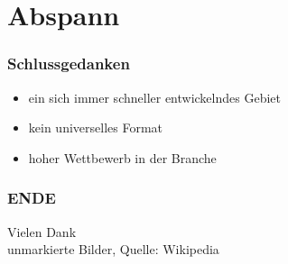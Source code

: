 \documentclass{beamer}
\begin{document}
\section{Abspann}

\begin{frame}
\frametitle{Schlussgedanken}
\begin{itemize}
	\Large	
	\item ein sich immer schneller entwickelndes Gebiet
	\vspace{0.5cm}\item kein universelles Format
	\vspace{0.5cm}\item hoher Wettbewerb in der Branche
\end{itemize}	
\end{frame}

\begin{frame}
\frametitle{ENDE}
\centering 
\Huge
Vielen Dank\\
\vspace{3cm}
\normalsize unmarkierte Bilder, Quelle: Wikipedia
\end{frame}
\end{document}
